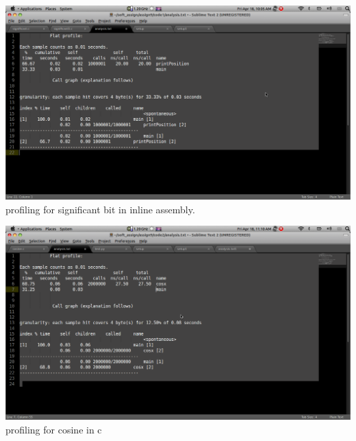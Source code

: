 \documentclass[a4paper,12pt]{report}
\begin{document}
\begin{center}
 \includegraphics[width=13 cm,height=12 cm]{./significant1.png}
profiling  for significant bit in inline assembly.
\end{center}
\begin{center}
 \includegraphics[width=13 cm,height=12 cm]{./cosine.png}
profiling for cosine in c
\end{center}
\end{document}
